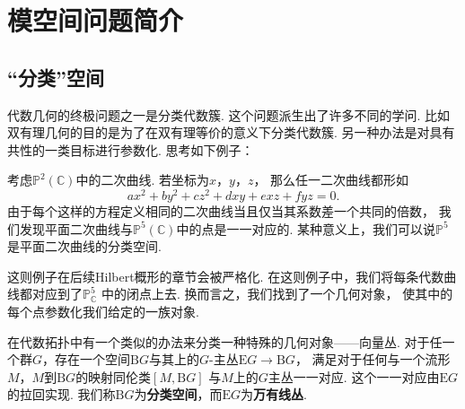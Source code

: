 \newcommand{\sch}[1]{\mathbf{Sch}_{#1}}
\newcommand{\Sch}{\mathbf{Sch}}
\newcommand{\grp}{\mathbf{Grp}}
\newcommand{\ab}{\mathbf{AbGrp}}
\newcommand{\ring}{\mathbf{Ring}}
\newcommand{\sets}{\mathbf{Sets}}
\newcommand{\op}{\mathrm{op}}
\newcommand{\spec}{\operatorname{Spec}}
\renewcommand{\hom}{\operatorname{Hom}}
\newcommand{\oalg}[1]{\mathscr{O}_{#1}-\mathbf{Alg}}
\newcommand{\gr}[2]{\mathscr{Gr}(#1,#2)}
\newcommand{\grass}[3]{\mathscr{Grass}_{#1}(#2,#3)}
\newcommand{\hilb}{\operatorname{Hilb}}
\newcommand{\rB}{\mathrm{B}}
\newcommand{\rE}{\mathrm{E}}

\section{模空间问题简介}
    
    \subsection{“分类”空间}
    代数几何的终极问题之一是分类代数簇. 这个问题派生出了许多不同的学问. 
    比如双有理几何的目的是为了在双有理等价的意义下分类代数簇. 
    另一种办法是对具有共性的一类目标进行参数化. 思考如下例子：
    \begin{example}
        考虑$\mathbb{P}^{2}(\mathbb{C})$中的二次曲线. 若坐标为$x$，$y$，$z$，
        那么任一二次曲线都形如
        \[ax^{2} + by^{2} + cz^{2} + dxy + exz + fyz = 0.\]
        由于每个这样的方程定义相同的二次曲线当且仅当其系数差一个共同的倍数，
        我们发现平面二次曲线与$\mathbb{P}^{5}(\mathbb{C})$中的点是一一对应的.
        某种意义上，我们可以说$\mathbb{P}^{5}$是平面二次曲线的分类空间.
    \end{example}

    这则例子在后续Hilbert概形的章节会被严格化. 
    在这则例子中，我们将每条代数曲线都对应到了$\mathbb{P}_{\mathbb{C}}^{5}$
    中的闭点上去. 换而言之，我们找到了一个几何对象，
    使其中的每个点参数化我们给定的一族对象.

    在代数拓扑中有一个类似的办法来分类一种特殊的几何对象——向量丛. 
    对于任一个群$G$，存在一个空间$\rB G$与其上的$G$-主丛$\rE G \to \rB G$，
    满足对于任何与一个流形$M$，$M$到$\rB G$的映射同伦类$[M,\rB G]$
    与$M$上的$G$主丛一一对应. 这个一一对应由$\rE G$的拉回实现.
    我们称$\rB G$为\textbf{分类空间}，而$\rE G$为\textbf{万有线丛}.


